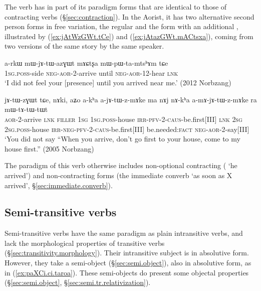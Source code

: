 The verb  has in part of its paradigm forms that are identical to those of contracting verbs (§\ref{sec:contraction}). In the Aorist, it has two alternative second person forms in free variation, the regular  and the form  with an additional , illustrated by (\ref{ex:jAtWzGWt.tCe}) and  (\ref{ex:jAtazGWt.mACtsxa}), coming from two versions of the same story by the same speaker. 

\begin{exe}
\ex \label{ex:jAtazGWt.mACtsxa}
\gll  a-rkɯ mɯ-jɤ-tɯ-azɣɯt mɤɕtʂa mɯ-pɯ-ta-mtsʰɤm tɕe \\
\textsc{1sg}.\textsc{poss}-side \textsc{neg}-\textsc{aor}-2-arrive until \textsc{neg}-\textsc{aor}-1\fl{}2-hear \textsc{lnk} \\
\glt `I did not feel your [presence] until you arrived near me.' (2012 Norbzang) 
\end{exe}

\begin{exe}
\ex \label{ex:jAtWzGWt.tCe}
\gll jɤ-tɯ-zɣɯt tɕe, nɤki, aʑo a-kʰa a-jɤ-tɯ-z-mɤke ma nɤj nɤ-kʰa a-mɤ-jɤ-tɯ-z-mɤke ra mɯ-tɤ-tɯ-tɯt \\
\textsc{aor}-2-arrive \textsc{lnk} \textsc{filler} \textsc{1sg} \textsc{1sg}.\textsc{poss}-house \textsc{irr}-\textsc{pfv}-2-\textsc{caus}-be.first[III] \textsc{lnk} 
\textsc{2sg} \textsc{2sg}.\textsc{poss}-house \textsc{irr}-\textsc{neg}-\textsc{pfv}-2-\textsc{caus}-be.first[III] be.needed:\textsc{fact} \textsc{neg}-\textsc{aor}-2-say[III] \\
\glt `You did not say ``When you arrive, don't go first to your house, come to my house first.'' (2005 Norbzang)
\end{exe}

The paradigm of this verb otherwise includes non-optional contracting ( `he arrived') and non-contracting forms (the immediate converb  `as soon as X arrived', §\ref{sec:immediate.converb}).

\subsection{Semi-transitive verbs} \label{sec:semi.transitive}
Semi-transitive verbs have the same paradigm as plain intransitive verbs, and lack the morphological properties of transitive verbs (§\ref{sec:transitivity.morphology}). Their intransitive subject is in absolutive form. However, they take a semi-object (§\ref{sec:semi.object}), also in absolutive form, as  in (\ref{ex:paXCi.ci.taroa}). These semi-objects do present some objectal properties (§\ref{sec:semi.object}, §\ref{sec:semi.tr.relativization}).
 
